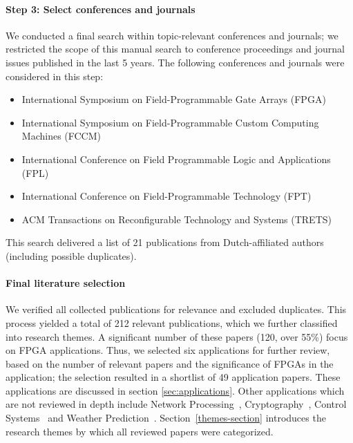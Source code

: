\paragraph{Step 3: Select conferences and journals}
We conducted a final search within topic-relevant conferences and journals;  %
we restricted the scope of this manual search to conference proceedings and journal issues published in the last 5 years. The following conferences and journals were considered in this step: 
\begin{itemize}
    \item International Symposium on Field-Programmable Gate Arrays (FPGA)
    \item International Symposium on Field-Programmable Custom Computing Machines (FCCM)
    \item International Conference on Field Programmable Logic and Applications (FPL)
    \item International Conference on Field-Programmable Technology (FPT)
    \item ACM Transactions on Reconfigurable Technology and Systems (TRETS)
\end{itemize}
This search delivered a list of 21 publications from Dutch-affiliated authors (including possible duplicates).

\paragraph{Final literature selection}

We verified all collected publications for relevance and excluded duplicates. This process yielded a total of 212 relevant publications, which we further classified into research themes. A significant number of these papers (120, over 55\%) focus on FPGA applications. Thus, we selected six applications for further review, based on the number of relevant papers and the significance of FPGAs in the application; the selection  resulted in a shortlist of 49 application papers. These applications are discussed in section \ref{sec:applications}. Other applications which are not reviewed in depth include Network Processing~\cite{Kundel2021OpenBNG:Hardware}, Cryptography~\cite{Massolino2020ASIKE}, Control Systems~\cite{Moonen2021Simulink-BasedSystems} and Weather Prediction~\cite{Singh2020NERO:Modeling}.  %
Section~\ref{themes-section} introduces the research themes by which all reviewed papers were categorized. 

